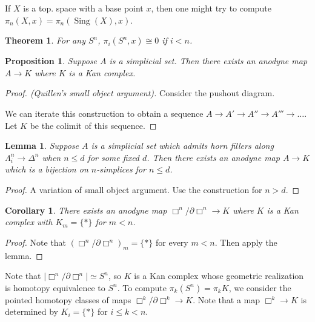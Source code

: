 \documentclass{article}
\theoremstyle{definition}
\theoremstyle{remark}
\theoremstyle{plain}
\newtheorem{lem}[defn]{Lemma}
\newtheorem{thm}[defn]{Theorem}
\newtheorem{prop}[defn]{Proposition}
\newtheorem{crly}[defn]{Corollary}
\newcommand{\sing}{\operatorname{Sing}}
\begin{document}
If $X$ is a top. space with a base point $x$, then one might try to compute $\pi_n(X,x)=\pi_n(\sing(X),x)$.

\begin{thm}
    For any $S^n$, $\pi_i(S^n,x)\cong 0$ if $i<n$.
\end{thm}
\begin{prop}
    Suppose $A$ is a simplicial set. Then there exists an anodyne map $A\to K$ where $K$ is a Kan complex.
\end{prop}
\begin{proof}[Proof. (Quillen's small object argument)]
    Consider the pushout diagram.
    \begin{center}
    \end{center}
    We can iterate this construction to obtain a sequence $A\to A'\to A''\to A'''\to\ldots$. Let $K$ be the colimit of this sequence.
\end{proof}
\begin{lem}
    Suppose $A$ is a simplicial set which admits horn fillers along $\Lambda_i^n\to\Delta^n$ when $n\le d$ for some fixed $d$. Then there exists an anodyne map $A\to K$ which is a bijection on $n$-simplices for $n\le d$.
\end{lem}
\begin{proof}
    A variation of small object argument. Use the construction for $n>d$.
\end{proof}
\begin{crly}
    There exists an anodyne map $\Box^n/\partial\Box^n\to K$ where $K$ is a Kan complex with $K_m=\{\ast\}$ for $m<n$.
\end{crly}
\begin{proof}
    Note that $(\Box^n/\partial\Box^n)_m=\{\ast\}$ for every $m<n$. Then apply the lemma.
\end{proof}
Note that $|\Box^n/\partial\Box^n|\simeq S^n$, so $K$ is a Kan complex whose geometric realization is homotopy equivalence to $S^n$. To compute $\pi_k(S^n)=\pi_k K$, we consider the pointed homotopy classes of maps $\Box^k/\partial\Box^k\to K$. Note that a map $\Box^k\to K$ is determined by $K_i=\{\ast\}$ for $i\le k<n$.
\end{document}
